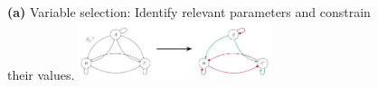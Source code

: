 \documentclass[border=10pt,varwidth=20cm]{standalone}
\begin{document}

\bigskip

\setlength{\fboxrule}{1pt}
{\begin{minipage}[c]{0.985\textwidth}
   \begin{figure}[H]
      \centering
      \vspace{0.3cm}
      {\large \textbf{(a)} Variable selection: Identify relevant parameters and constrain their values.}
      \vspace{0.3cm}
      \includegraphics[width=0.5\textwidth]{panel1}
   \end{figure}
\end{minipage}}

\bigskip
\end{document}
